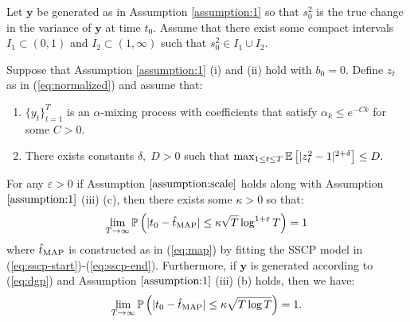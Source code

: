 \begin{assumption}\label{assumption:scale}
   Let $\mathbf{y}$ be generated as in Assumption \ref{assumption:1} so that $s_0^2$ is the true change in the variance of $\mathbf{y}$ at time $t_0$. Assume that there exist some compact intervals $I_1 \subset (0, 1)$ and $I_2 \subset (1, \infty)$ such that $s_0^2 \in I_1 \cup I_2$. 
\end{assumption}

\begin{theorem}\label{theorem:sscp}
    Suppose that Assumption \ref{assumption:1} (i) and (ii) hold with $b_0=0$. Define $z_t$ as in (\ref{eq:normalized}) and assume that:
    \vspace{-10pt}
    \begin{enumerate}[label=(\roman*)]
        \item $\{y_t\}_{t=1}^T$ is an $\alpha$-mixing process with coefficients that satisfy $\alpha_k \leq e^{-Ck}$ for some $C > 0$.
        \item There exists constants $\delta, \; D > 0$ such that $\max_{1\leq t \leq T} \E\left[|z_t^2 - 1|^{2+\delta}\right]\leq D.$ 
    \end{enumerate}
    \vspace{-5pt}
    For any $\varepsilon > 0$ if Assumption $\ref{assumption:scale}$ holds along with Assumption $\ref{assumption:1}$ (iii) (c), then there exists some $\kappa > 0$ so that: 
    \vspace{-5pt}
    \begin{align*}
        \lim_{T\to\infty}\Pr\left(|t_0 - \hat{t}_{\normalfont \text{MAP}}| \leq \kappa \sqrt{T}\log^{1+\varepsilon} T\right) = 1  
    \end{align*}
    where $\hat{t}_{\normalfont \text{MAP}}$ is constructed as in (\ref{eq:map}) by fitting the SSCP model in (\ref{eq:sscp-start})-(\ref{eq:sscp-end}). Furthermore, if $\mathbf{y}$ is generated according to (\ref{eq:dgp}) and Assumption $\ref{assumption:1}$ (iii) (b) holds, then we have:
    \vspace{-5pt}
    \begin{align*}
        \lim_{T\to\infty}\Pr\left(|t_0 - \hat{t}_{\normalfont \text{MAP}}| \leq \kappa \sqrt{T\log T}\right) = 1.  
    \end{align*}
\end{theorem}

